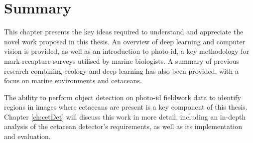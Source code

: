 \section{Summary}\label{ch:Background,sec:Summary}

This chapter presents the key ideas required to understand and appreciate the novel work proposed in this thesis. An overview of deep learning and computer vision is provided, as well as an introduction to photo-id, a key methodology for mark-recapture surveys utilised by marine biologists. A summary of previous research combining ecology and deep learning has also been provided, with a focus on marine environments and cetaceans. 

The ability to perform object detection on photo-id fieldwork data to identify regions in images where cetaceans are present is a key component of this thesis. Chapter \ref{ch:cetDet} will discuss this work in more detail, including an in-depth analysis of the cetacean detector's requirements, as well as its implementation and evaluation.

